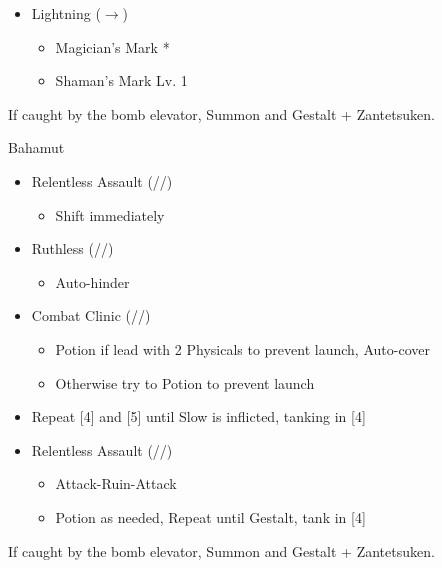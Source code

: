 \begin{paracol}{2}
\begin{menu}
\begin{itemize}
\begin{itemize}
\begin{itemize}
				      \end{itemize}
				\item Lightning ($\rightarrow$)
				      \begin{itemize}
					      \item Magician's Mark *
					      \item Shaman's Mark Lv. 1
				      \end{itemize}
			\end{itemize}
		\end{itemize}
	\end{menu}
	\switchcolumn*
	If caught by the bomb elevator, Summon and Gestalt + Zantetsuken.
	\renewcommand{\first}{[1] Relentless Assault (\com/\rav/\rav)}
	\renewcommand{\fifth}{[5] Ruthless (\sab/\com/\rav)
		\renewcommand{\fourth}{[4] Combat Clinic (\sen/\med/\med)}}
	\begin{battle}{Bahamut}
		\begin{itemize}
			\item \first
			      \begin{itemize}
				      \item Shift immediately
			      \end{itemize}
			\item \fifth
			      \begin{itemize}
				      \item Auto-hinder
			      \end{itemize}
			\item \fourth
			      \begin{itemize}
				      \item Potion if lead with 2 Physicals to prevent launch, Auto-cover
				      \item Otherwise try to Potion to prevent launch
			      \end{itemize}
			\item Repeat [4] and [5] until Slow is inflicted, tanking in [4]
			\item \first
			      \begin{itemize}
				      \item Attack-Ruin-Attack
				      \item Potion as needed, Repeat until Gestalt, tank in [4]
			      \end{itemize}
		\end{itemize}
	\end{battle}
	\switchcolumn
	If caught by the bomb elevator, Summon and Gestalt + Zantetsuken.

\end{paracol}
